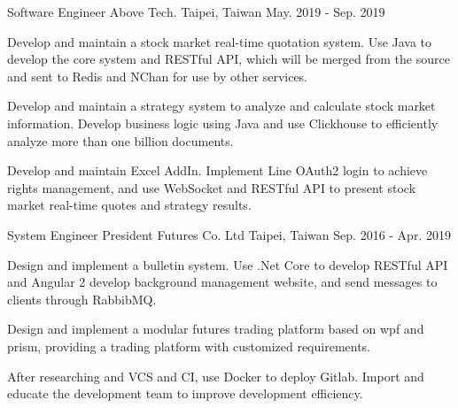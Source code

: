\begin{cventries}
\cventry
{Software Engineer} %
{Above Tech.} %
{Taipei, Taiwan} %
{May. 2019 - Sep. 2019} %
{
  \begin{cvitems} %
    \item {Develop and maintain a stock market real-time quotation system. Use Java to develop the core system and RESTful API, which will be merged from the source and sent to Redis and NChan for use by other services.}
    \item {Develop and maintain a strategy system to analyze and calculate stock market information. Develop business logic using Java and use Clickhouse to efficiently analyze more than one billion documents.}
    \item {Develop and maintain Excel AddIn. Implement Line OAuth2 login to achieve rights management, and use WebSocket and RESTful API to present stock market real-time quotes and strategy results.}
  \end{cvitems}
}

\cventry
{System Engineer} %
{President Futures Co. Ltd} %
{Taipei, Taiwan} %
{Sep. 2016 - Apr. 2019} %
{
  \begin{cvitems} %
    \item {Design and implement a bulletin system. Use .Net Core to develop RESTful API and Angular 2 develop background management website, and send messages to clients through RabbibMQ.}
    \item {Design and implement a modular futures trading platform based on wpf and prism, providing a trading platform with customized requirements.}
    \item {After researching and VCS and CI, use Docker to deploy Gitlab. Import and educate the development team to improve development efficiency.}
  \end{cvitems}
}

\end{cventries}

